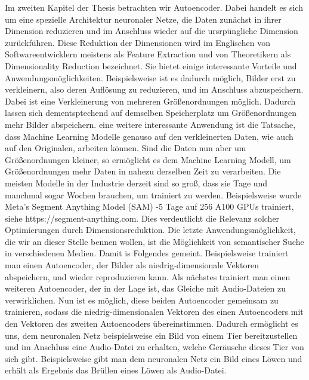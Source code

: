 \documentclass[11pt, twoside, a4paper]{book}
\theoremstyle{plain}
\theoremstyle{definition}
\theoremstyle{plain}
\begin{document}
Im zweiten Kapitel der Thesis betrachten wir Autoencoder. Dabei handelt es sich um eine spezielle Architektur neuronaler Netze, die Daten zunächst in ihrer Dimension reduzieren und im Anschluss wieder auf die ursrpüngliche Dimension zurückführen. Diese Reduktion der Dimensionen wird im Englischen von Softwareentwicklern meistens als \glqq Feature Extraction\grqq{} und von Theoretikern als \glqq Dimensionality Reduction\grqq{} bezeichnet. Sie bietet einige interessante Vorteile und Anwendungsmöglichkeiten. Beispielsweise ist es dadurch möglich, Bilder erst zu verkleinern, also deren Auflösung zu reduzieren, und im Anschluss abzuspeichern. Dabei ist eine Verkleinerung von mehreren Größenordnungen möglich. Dadurch lassen sich dementsptechend auf demselben Speicherplatz um Größenordnungen mehr Bilder abspeichern. eine weitere interessante Anwendung ist die Tatsache, dass Machine Learning Modelle genauso auf den \glqq verkleinerten\grqq{} Daten, wie auch auf den Originalen, arbeiten können. Sind die Daten nun aber um Größenordnungen kleiner, so ermöglicht es dem Machine Learning Modell, um Größenordnungen mehr Daten in nahezu derselben Zeit zu verarbeiten. Die meisten Modelle in der Industrie derzeit sind so groß, dass sie Tage und manchmal sogar Wochen brauchen, um trainiert zu werden. Beispielsweise wurde Meta's Segment Anything Model (SAM) -5 Tage auf 256 A100 GPUs\grqq{} trainiert, siehe https://segment-anything.com. Dies verdeutlicht die Relevanz solcher Optimierungen durch Dimensionsreduktion. Die letzte Anwendungsmöglichkeit, die wir an dieser Stelle bennen wollen, ist die Möglichkeit von semantischer Suche in verschiedenen Medien. Damit is Folgendes gemeint. Beispielsweise trainiert man einen Autoencoder, der Bilder als niedrig-dimensionale Vektoren abspeichern, und wieder reproduzieren kann. Als nächstes trainiert man einen weiteren Autoencoder, der in der Lage ist, das Gleiche mit Audio-Dateien zu verwirklichen. Nun ist es möglich, diese beiden Autoencoder gemeinsam zu trainieren, sodass die niedrig-dimensionalen Vektoren des einen Autoencoders mit den Vektoren des zweiten Autoencoders übereinstimmen. Dadurch ermöglicht es uns, dem neuronalen Netz beispielsweise ein Bild von einem Tier bereitzustellen und im Anschluss eine Audio-Datei zu erhalten, welche Geräusche dieses Tier von sich gibt. Beispielsweise gibt man dem neuronalen Netz ein Bild eines Löwen und erhält als Ergebnis das Brüllen eines Löwen als Audio-Datei.
\end{document}
